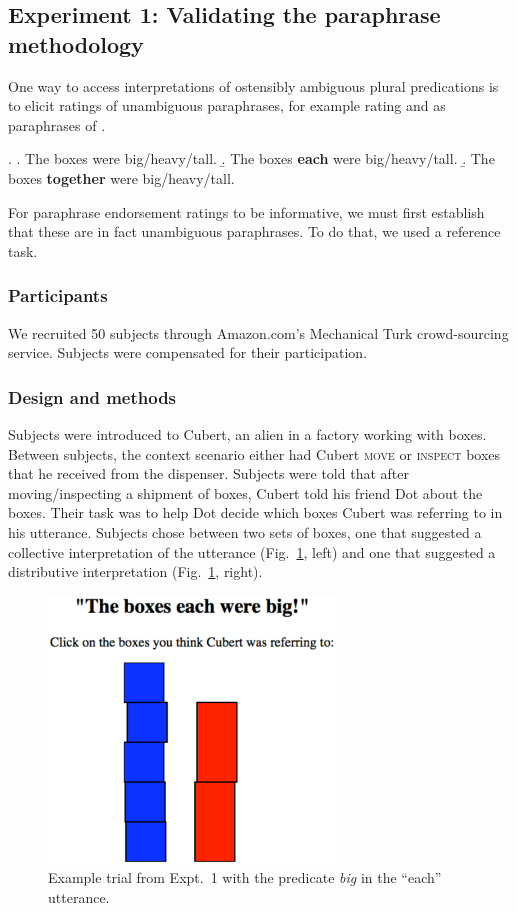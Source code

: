 \documentclass[linguex]{sp}
\begin{document}
\subsection{Experiment 1: Validating the paraphrase methodology}

One way to access interpretations of ostensibly ambiguous plural predications is to elicit ratings of unambiguous paraphrases, for example rating \Next[b] and \Next[c] as paraphrases of \Next[a].

\ex. \a. The boxes were big/heavy/tall.
\b.\label{each} The boxes \textbf{each} were big/heavy/tall.
\b.\label{together} The boxes \textbf{together} were big/heavy/tall.

For paraphrase endorsement ratings to be informative, we must first establish that these are in fact unambiguous paraphrases. To do that, we used a reference task.

\subsubsection{Participants}

We recruited 50 subjects through Amazon.com's Mechanical Turk crowd-sourcing service. Subjects were compensated for their participation.


\subsubsection{Design and methods}

Subjects were introduced to Cubert, an alien in a factory working with boxes. Between subjects, the context scenario either had Cubert \textsc{move} or \textsc{inspect} boxes that he received from the dispenser. Subjects were told that after moving/inspecting a shipment of boxes, Cubert told his friend Dot about the boxes. Their task was to help Dot decide which boxes Cubert was referring to in his utterance. Subjects chose between two sets of boxes, one that suggested a collective interpretation of the utterance (Fig.\ \ref{expt1trial}, left) and one that suggested a distributive interpretation (Fig.\ \ref{expt1trial}, right).

\begin{figure}[h]
	\centering
	\includegraphics[width=3in]{images/trial2.eps}
	\caption{Example trial from Expt.~1 with the predicate \emph{big} in the ``each'' utterance.}\label{expt1trial}
\end{figure}
\end{document}
